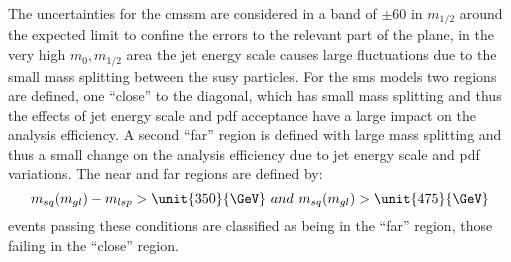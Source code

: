 The uncertainties for the \ac{cmssm} are considered in a band of 
$\pm$\unit{60}{\GeV} in $m_{1/2}$ around the expected limit to confine the 
errors to the relevant part of the plane, in the very high $m_{0},m_{1/2}$ area 
the jet energy scale causes large fluctuations due to the small mass splitting 
between the \ac{susy} particles.
For the \ac{sms} models two regions are defined, one ``close'' to the diagonal, 
which has small mass splitting and thus the effects of jet energy scale and 
\ac{pdf} acceptance have a large impact on the analysis efficiency. A second 
``far'' region is defined with large mass splitting and thus a small change on 
the analysis efficiency due to jet energy scale and \ac{pdf} variations. The 
near and far regions are defined by:
\begin{equation}
  m_{sq}(m_{gl}) - m_{lsp} > \unit{350}{\GeV}~and~m_{sq}(m_{gl}) > \unit{475}{\GeV}
\end{equation}
events passing these conditions are classified as being in the ``far'' region, 
those failing in the ``close'' region.
 

